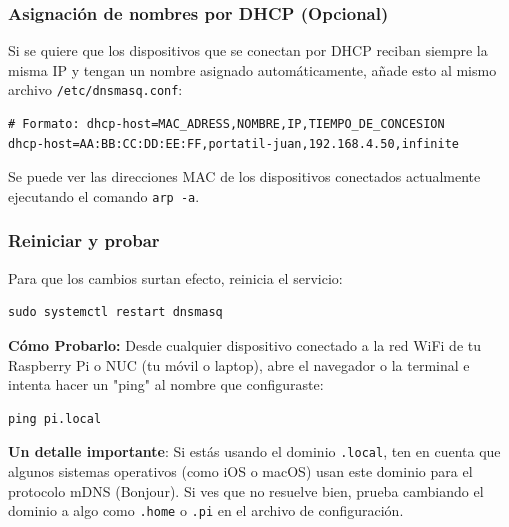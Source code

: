 \subsubsection{Asignación de nombres por DHCP (Opcional)}

Si se quiere que los dispositivos que se conectan por DHCP reciban
siempre la misma IP y tengan un nombre asignado automáticamente,
añade esto al mismo archivo \texttt{/etc/dnsmasq.conf}:

\begin{lstlisting}
# Formato: dhcp-host=MAC_ADRESS,NOMBRE,IP,TIEMPO_DE_CONCESION
dhcp-host=AA:BB:CC:DD:EE:FF,portatil-juan,192.168.4.50,infinite
\end{lstlisting}

Se puede ver las direcciones MAC de los dispositivos conectados
actualmente ejecutando el comando \texttt{arp -a}.

\subsubsection{Reiniciar y probar}

Para que los cambios surtan efecto, reinicia el servicio:

\begin{lstlisting}
sudo systemctl restart dnsmasq
\end{lstlisting}

\textbf{Cómo Probarlo:}
Desde cualquier dispositivo conectado a la red WiFi de tu Raspberry
Pi o NUC (tu móvil o laptop), abre el navegador o la terminal e
intenta hacer un "ping" al nombre que configuraste:

\begin{lstlisting}
ping pi.local
\end{lstlisting}

\textbf{Un detalle importante}: Si estás usando el dominio \texttt{.local},
ten en cuenta que algunos sistemas operativos (como iOS o macOS)
usan este dominio para el protocolo mDNS (Bonjour). Si ves que no
resuelve bien, prueba cambiando el dominio a algo como \texttt{.home} o
\texttt{.pi} en el archivo de configuración.

